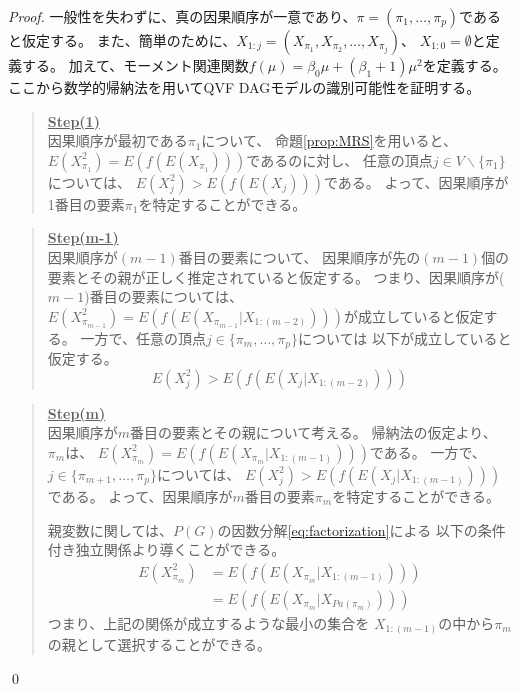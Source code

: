 \begin{proof}
  一般性を失わずに、真の因果順序が一意であり、$\pi = (\pi_1, \dots, \pi_p)$であると仮定する。
  また、簡単のために、$X_{1:j} = (X_{\pi_1}, X_{\pi_2}, \dots, X_{\pi_j})$、
  $X_{1:0} = \emptyset$と定義する。
  加えて、モーメント関連関数$f(\mu) = \beta_0 \mu + (\beta_1 + 1)\mu^2$を定義する。
  ここから数学的帰納法を用いてQVF DAGモデルの識別可能性を証明する。

  \begin{quote}
    \underline{\textbf{Step(1)}} \\
    因果順序が最初である$\pi_1$について、
    命題\ref{prop:MRS}を用いると、
    $E(X_{\pi_1}^2) = E(f(E(X_{\pi_1})))$であるのに対し、
    任意の頂点$j \in V \backslash \{ \pi_1 \}$については、
    $E(X_j ^2) > E(f(E(X_j)))$である。
    よって、因果順序が1番目の要素$\pi_1$を特定することができる。
  \end{quote}

  \begin{quote}
    \underline{\textbf{Step(m-1)}} \\
    因果順序が$(m-1)$番目の要素について、
    因果順序が先の$(m-1)$個の要素とその親が正しく推定されていると仮定する。
    つまり、因果順序が($m-1$)番目の要素については、
    $E(X_{\pi_{m-1}}^2) = E(f(E(X_{\pi_{m-1}} | X_{1:(m-2)})))$が成立していると仮定する。
    一方で、任意の頂点$j \in \{\pi_m, \dots, \pi_p \}$については
    以下が成立していると仮定する。
    \begin{equation*}
      E(X_j^2) > E(f(E(X_j | X_{1:(m-2)})))
    \end{equation*}
  \end{quote}

  \begin{quote}
    \underline{\textbf{Step(m)}} \\
    因果順序が$m$番目の要素とその親について考える。
    帰納法の仮定より、$\pi_m$は、
    $E(X_{\pi_m}^2) = E(f(E(X_{\pi_m} | X_{1:(m-1)})))$である。
    一方で、$j \in \{ \pi_{m+1}, \dots, \pi_p \}$については、
    $E(X_j^2) > E(f(E(X_j | X_{1:(m-1)})))$である。
    よって、因果順序が$m$番目の要素$\pi_m$を特定することができる。

    親変数に関しては、$P(G)$の因数分解\eqref{eq:factorization}による
    以下の条件付き独立関係より導くことができる。
    \begin{align*}
      E(X_{\pi_m}^2) &= E(f(E(X_{\pi_m} | X_{1:(m-1)}))) \\
                     &= E(f(E(X_{\pi_m} | X_{Pa(\pi_m)})))
    \end{align*}
    つまり、上記の関係が成立するような最小の集合を
    $X_{1:(m-1)}$の中から$\pi_m$の親として選択することができる。
  \end{quote}
\qed
\end{proof}

